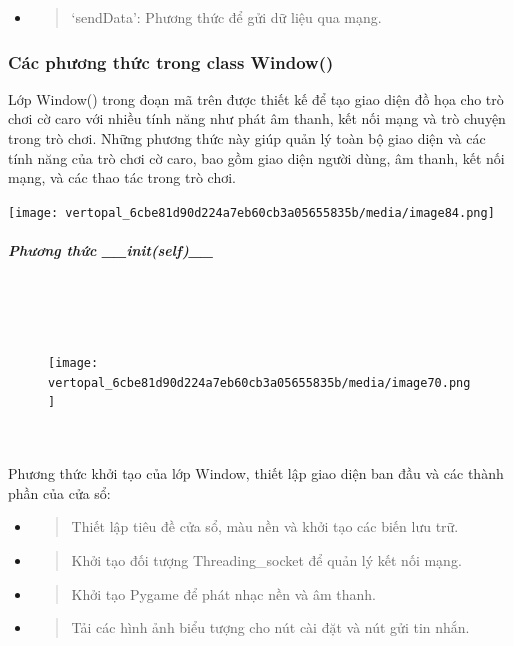 \documentclass[a4paper]{article}
\begin{document}
\begin{itemize}
\item
  \begin{quote}
  `sendData': Phương thức để gửi dữ liệu qua mạng.
  \end{quote}
\end{itemize}

\hypertarget{cuxe1c-phux1b0ux1a1ng-thux1ee9c-trong-class-window}{%
\subsubsection{Các phương thức trong class
Window()}\label{cuxe1c-phux1b0ux1a1ng-thux1ee9c-trong-class-window}}

Lớp Window() trong đoạn mã trên được thiết kế để tạo giao diện đồ họa
cho trò chơi cờ caro với nhiều tính năng như phát âm thanh, kết nối mạng
và trò chuyện trong trò chơi. Những phương thức này giúp quản lý toàn bộ
giao diện và các tính năng của trò chơi cờ caro, bao gồm giao diện người
dùng, âm thanh, kết nối mạng, và các thao tác trong trò chơi.

\texttt{[image: vertopal\_6cbe81d90d224a7eb60cb3a05655835b/media/image84.png]}
\\

\hypertarget{phux1b0ux1a1ng-thux1ee9c-__initself__}{%
\paragraph{\texorpdfstring{\emph{Phương thức
\_\_init(self)\_\_}}{Phương thức \_\_init(self)\_\_}}\label{phux1b0ux1a1ng-thux1ee9c-__initself__}}
\\
\\
\\
\begin{figure}
    \centering
\texttt{[image: vertopal\_6cbe81d90d224a7eb60cb3a05655835b/media/image70.png]}

\end{figure}


\\
\\
Phương thức khởi tạo của lớp Window, thiết lập giao diện ban đầu và các
thành phần của cửa sổ:

\begin{itemize}
\item
  \begin{quote}
  Thiết lập tiêu đề cửa sổ, màu nền và khởi tạo các biến lưu trữ.
  \end{quote}
\item
  \begin{quote}
  Khởi tạo đối tượng Threading\_socket để quản lý kết nối mạng.
  \end{quote}
\item
  \begin{quote}
  Khởi tạo Pygame để phát nhạc nền và âm thanh.
  \end{quote}
\item
  \begin{quote}
  Tải các hình ảnh biểu tượng cho nút cài đặt và nút gửi tin nhắn.
  \end{quote}
\end{itemize}
\end{document}
